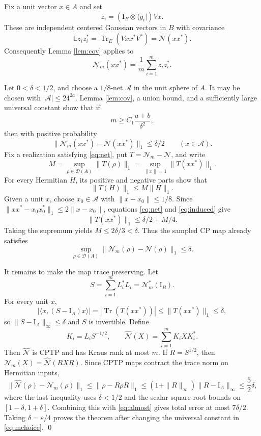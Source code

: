 \documentclass[11pt]{article}
\newcommand{\cD}{\mathcal D}
\newcommand{\Tr}{\operatorname{Tr}}
\newcommand{\Id}{\mathrm I}
\newcommand{\E}{\mathbb E}
\begin{document}
Fix a unit vector $x\in A$ and set
\[
z_i=(\Id_B\otimes\langle g_i|)Vx.
\]
These are independent centered Gaussian vectors in $B$ with covariance
\[
\E z_i z_i^*=\Tr_E(Vxx^*V^*)=\mathcal N(xx^*).
\]
Consequently Lemma \ref{lem:cov} applies to
\[
\mathcal N_m(xx^*)=\frac1m\sum_{i=1}^m z_i z_i^*.
\]

Let $0<\delta<1/2$, and choose a $1/8$-net $\mathcal A$ in the unit sphere of $A$.  It may be chosen with
$|\mathcal A|\leq24^{2a}$.  Lemma \ref{lem:cov}, a union bound, and a sufficiently large universal constant show that if
\begin{equation}\label{eq:mchoice}
m\geq C_1\frac{a+b}{\delta^2},
\end{equation}
then with positive probability
\begin{equation}\label{eq:net}
\|\mathcal N_m(xx^*)-\mathcal N(xx^*)\|_1\leq\delta/2
\qquad(x\in\mathcal A).
\end{equation}
Fix a realization satisfying \eqref{eq:net}, put $T=\mathcal N_m-\mathcal N$, and write
\[
M=\sup_{\rho\in\cD(A)}\|T(\rho)\|_1
=\sup_{\|x\|=1}\|T(xx^*)\|_1.
\]
For every Hermitian $H$, its positive and negative parts show that
\begin{equation}\label{eq:induced}
\|T(H)\|_1\leq M\|H\|_1.
\end{equation}
Given a unit $x$, choose $x_0\in\mathcal A$ with $\|x-x_0\|\leq1/8$.  Since
$\|xx^*-x_0x_0^*\|_1\leq2\|x-x_0\|$, equations \eqref{eq:net} and \eqref{eq:induced} give
\[
\|T(xx^*)\|_1\leq\delta/2+M/4.
\]
Taking the supremum yields $M\leq2\delta/3<\delta$.  Thus the sampled CP map already satisfies
\begin{equation}\label{eq:almost}
\sup_{\rho\in\cD(A)}
\|\mathcal N_m(\rho)-\mathcal N(\rho)\|_1\leq\delta.
\end{equation}

It remains to make the map trace preserving.  Let
\[
S=\sum_{i=1}^mL_i^*L_i=\mathcal N_m^*(\Id_B).
\]
For every unit $x$,
\[
|\langle x,(S-\Id_A)x\rangle|
=|\Tr(T(xx^*))|
\leq\|T(xx^*)\|_1\leq\delta,
\]
so $\|S-\Id_A\|_\infty\leq\delta$ and $S$ is invertible.  Define
\[
K_i=L_iS^{-1/2},
\qquad
\widehat{\mathcal N}(X)=\sum_{i=1}^mK_iXK_i^*.
\]
Then $\widehat{\mathcal N}$ is CPTP and has Kraus rank at most $m$.  If $R=S^{1/2}$, then
$\mathcal N_m(X)=\widehat{\mathcal N}(RXR)$.  Since CPTP maps contract the trace norm on Hermitian inputs,
\[
\|\widehat{\mathcal N}(\rho)-\mathcal N_m(\rho)\|_1
\leq\|\rho-R\rho R\|_1
\leq(1+\|R\|_\infty)\|R-\Id_A\|_\infty
\leq\frac52\delta,
\]
where the last inequality uses $\delta<1/2$ and the scalar square-root bounds on $[1-\delta,1+\delta]$.  Combining this with \eqref{eq:almost} gives total error at most $7\delta/2$.  Taking $\delta=\varepsilon/4$ proves the theorem after changing the universal constant in \eqref{eq:mchoice}.
\qed
\end{document}
